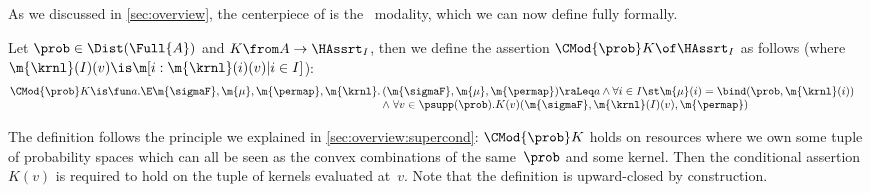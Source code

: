 \documentclass[acmsmall,nonacm,screen,appendix]{acmart}
\begin{document}
\subsection{\SuperCond}


As we discussed in \cref{sec:overview},
the centerpiece of \thelogic{} is the \supercond\ modality,
which we can now define fully formally.


\begin{definition}
  \label{def:c-mod}
  Let $ \prob \in \Dist(\Full{A}) $
  and $ K \from A \to \HAssrt_I $,
  then we define the assertion
  $ \CMod{\prob} K \of \HAssrt_I $
  as follows
  (where $ \m{\krnl}(I)(v) \is \m[i: \m{\krnl}(i)(v) | i \in I] $):
  \begin{align*}
    \CMod{\prob} K &\is
    \fun a.
    \begin{array}[t]{@{}r@{\,}l@{}}
      \E \m{\sigmaF}, \m{\mu}, \m{\permap}, \m{\krnl}.
      & (\m{\sigmaF}, \m{\mu}, \m{\permap}) \raLeq a
      \land
      \forall i\in I\st
      \m{\mu}(i) = \bind(\prob, \m{\krnl}(i))
   \\ & \land \;
   \forall v \in \psupp(\prob).
   K(v)(\m{\sigmaF}, \m{\krnl}(I)(v), \m{\permap})
    \end{array}
  \end{align*}

\end{definition}
The definition follows the principle we explained in
\cref{sec:overview:supercond}:
$ \CMod{\prob} K $ holds on resources where we own some
tuple of probability spaces which can all be seen
as the convex combinations of the same~$\prob$ and some kernel.
Then the conditional assertion~$K(v)$ is required to hold on the
tuple of kernels evaluated at~$v$.
Note that the definition is upward-closed by construction.
\end{document}

